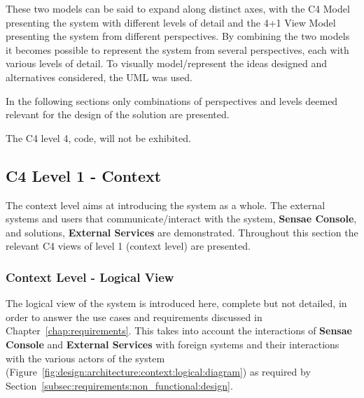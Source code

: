 These two models can be said to expand along distinct axes, with the C4 Model presenting the system with different levels of detail and the 4+1 View Model presenting the system from different perspectives. By combining the two models it becomes possible to represent the system from several perspectives, each with various levels of detail.
To visually model/represent the ideas designed and alternatives considered, the \gls{UML} was used.

In the following sections only combinations of perspectives and levels deemed relevant for the design of the solution are presented.

The C4 level 4, code, will not be exhibited.

\subsection{C4 Level 1 - Context}
\label{subsec:design:architecture:context}

The context level aims at introducing the system as a whole. The external systems and users that communicate/interact with the system, \textbf{Sensae Console}, and solutions, \textbf{External Services} are demonstrated.
Throughout this section the relevant C4 views of level 1 (context level) are presented.

\subsubsection{Context Level - Logical View}
\label{subsubsec:design:architecture:context:logical}

The logical view of the system is introduced here, complete but not detailed, in order to answer the use cases and requirements discussed in Chapter~\ref{chap:requirements}. This takes into account the interactions of \textbf{Sensae Console} and \textbf{External Services} with foreign systems and their interactions with the various actors of the system (Figure~\ref{fig:design:architecture:context:logical:diagram}) as required by Section~\ref{subsec:requirements:non_functional:design}.

